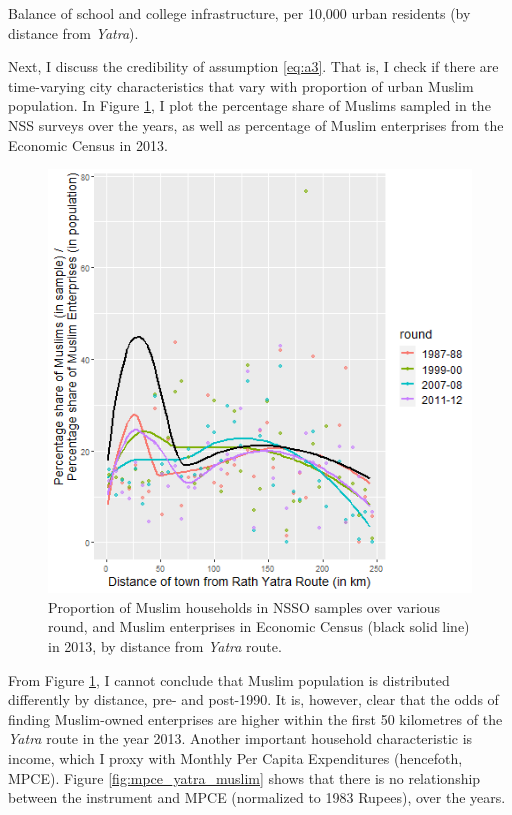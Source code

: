 \documentclass{article}
\begin{document}
 \begin{table}[H]
    \centering
    \resizebox{\textwidth}{!}{
    
    }
    \caption{Balance of school and college infrastructure, per 10,000 urban residents (by distance from \textit{Yatra}).}
    \label{tab:schools_yatra}
 \end{table}
 
Next, I discuss the credibility of assumption \ref{eq:a3}. That is, I check if there are time-varying city characteristics that vary with proportion of urban Muslim population. In Figure \ref{fig:permuslim_yatra}, I plot the percentage share of Muslims sampled in the NSS surveys over the years, as well as percentage of Muslim enterprises from the Economic Census in 2013.
 
 \begin{figure}[H]
     \centering
     \includegraphics[scale = 0.6]{images/graph_permuslim.png}
     \caption{Proportion of Muslim households in NSSO samples over various round, and Muslim enterprises in Economic Census (black solid line) in 2013, by distance from \textit{Yatra} route.}
     \label{fig:permuslim_yatra}
 \end{figure}
 
 From Figure \ref{fig:permuslim_yatra}, I cannot conclude that Muslim population is distributed differently by distance, pre- and post-1990. It is, however, clear that the odds of finding Muslim-owned enterprises are higher within the first 50 kilometres of the \textit{Yatra} route in the year 2013. Another important household characteristic is income, which I proxy with Monthly Per Capita Expenditures (hencefoth, MPCE). Figure \ref{fig:mpce_yatra_muslim} shows that there is no relationship between the instrument and MPCE (normalized to 1983 Rupees), over the years. 
 
\end{document}
